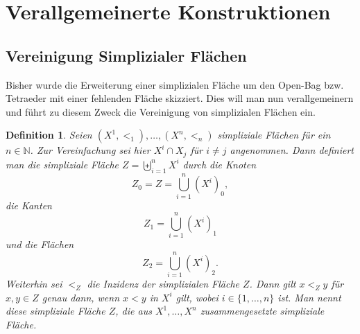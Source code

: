 \documentclass[12pt,titlepage]{article}
\newtheorem{definition}{Definition}[section]
\begin{document}
\section{Verallgemeinerte Konstruktionen}
\subsection{Vereinigung Simplizialer Flächen} 
Bisher wurde die Erweiterung einer simplizialen Fläche um den Open-Bag bzw. Tetraeder mit einer fehlenden Fläche skizziert. Dies will man nun verallgemeinern und führt zu diesem Zweck die Vereinigung von simplizialen Flächen ein.
\begin{definition} Seien $(X^1,<_1), \ldots,(X^n,<_n)$ simpliziale Flächen für ein $n \in \mathbb{N}$. Zur Vereinfachung sei hier $X^i\cap X_j$ für $i \neq j$ angenommen. Dann definiert man die simpliziale Fläche $Z=\biguplus\limits_{i=1}^{n} X^i$ durch
die Knoten 
\[
Z_0= Z=\bigcup\limits_{i=1}^{n} (X^i)_0,
\]
die Kanten 
\[
Z_1=\bigcup\limits_{i=1}^{n} (X^i)_1
\]
und die Flächen 
\[
Z_2=\bigcup\limits_{i=1}^{n} (X^i)_2.
\]
Weiterhin sei $<_Z$ die Inzidenz der simplizialen Fläche $Z$. Dann gilt $x<_{Z} y$ für $x,y \in Z$ genau dann, wenn $x<y$ in $X^i$ gilt, wobei $i \in \{1,\ldots,n\}$ ist. Man nennt diese simpliziale Fläche $Z$, die \emph{aus $X^1,\ldots,X^n$ zusammengesetzte simpliziale Fläche}.
\end{definition}
\end{document}
